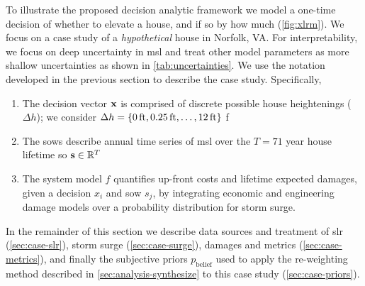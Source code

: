 \documentclass[11pt]{article}
\begin{document}
To illustrate the proposed decision analytic framework we model a one-time decision of whether to elevate a house, and if so by how much (\cref{fig:xlrm}).
We focus on a case study of a \emph{hypothetical} house in Norfolk, VA.
For interpretability, we focus on deep uncertainty in \gls{msl} and treat other model parameters as more shallow uncertainties as shown in \cref{tab:uncertainties}.
We use the notation developed in the previous section to describe the case study.
Specifically,
\begin{enumerate}
    \item The decision vector $\vb{x}$ is comprised of discrete possible house heightenings ($\Delta h$); we consider $\Delta h = \qty{\SI{0}{ft}, \SI{0.25}{ft}, \ldots, \SI{12}{ft}}$ f
    \item The \glspl{sow} describe annual time series of \gls{msl} over the $T=71$ year house lifetime so $\vb{s} \in \mathbb{R}^T$
    \item The system model $f$ quantifies up-front costs and lifetime expected damages, given a decision $x_i$ and \gls{sow} $s_j$, by integrating economic and engineering damage models over a probability distribution for storm surge.
\end{enumerate}
In the remainder of this section we describe data sources and treatment of \gls{slr} (\cref{sec:case-slr}), storm surge (\cref{sec:case-surge}), damages and metrics (\cref{sec:case-metrics}), and finally the subjective priors $p_\mathrm{belief}$ used to apply the re-weighting method described in \cref{sec:analysis-synthesize} to this case study (\cref{sec:case-priors}).
\end{document}
